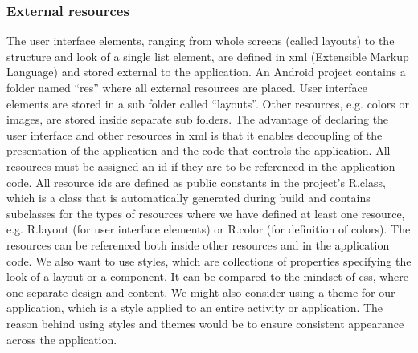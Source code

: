 \subsubsection{External resources}
The user interface elements, ranging from whole screens (called layouts) to the structure and look of a single list element, are defined in \gls{xml} (Extensible Markup Language) and stored external to the application. An Android project contains a folder named “res” where all external resources are placed. User interface elements are stored in a sub folder called “layouts”. Other resources, e.g. colors or images, are stored inside separate sub folders. The advantage of declaring the user interface and other resources in \gls{xml} is that it enables decoupling of the presentation of the application and the code that controls the application.
\newline
\newline
All resources must be assigned an \gls{id} if they are to be referenced in the application code. All resource \gls{id}s are defined as public constants in the project’s R.class, which is a class that is automatically generated during build and contains subclasses for the types of resources where we have defined at least one resource, e.g. R.layout (for user interface elements) or R.color (for definition of colors). The resources can be referenced both inside other resources and in the application code.
\newline
\newline
We also want to use styles, which are collections of properties specifying the look of a layout or a component. It can be compared to the mindset of \gls{css}, where one separate design and content. We might also consider using a theme for our application, which is a style applied to an entire activity or application. The reason behind using styles and themes would be to ensure consistent appearance across the application. 

